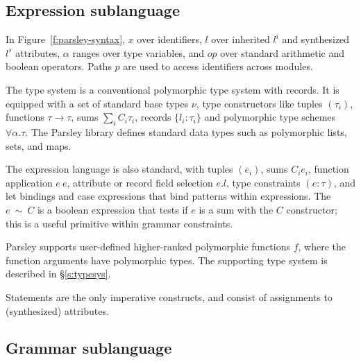 \documentclass[letterpaper]{article}
\begin{document}
\subsection*{Expression sublanguage}
\label{ss:lang:expr}

In Figure~\ref{f:parsley-syntax}, $x$ over identifiers, $l$ over
inherited $l^i$ and synthesized $l^s$ attributes, $\alpha$ ranges over
type variables, and $op$ over standard arithmetic and boolean
operators.  Paths $p$ are used to access identifiers across modules.

The type system is a conventional polymorphic type system
with records.  It is equipped with a set of standard base types $\nu$, type
constructors like tuples $(\tau_i)$, functions $\tau\rightarrow\tau$,
sums $\sum_iC_i\tau_i$, records $\{l_i:\tau_i\}$ and
polymorphic type schemes $\forall\alpha.\tau$.  The Parsley library
defines standard data types such as polymorphic lists, sets, and maps.

The expression language is also standard, with tuples $(e_i)$, sums
$C_i e_i$, function application $e\ e$, attribute or record field
selection $e.l$, type constraints $(e:\tau)$, and let bindings and
case expressions that bind patterns within expressions.  The
$e\ \sim\ C$ is a boolean expression that tests if $e$ is a sum with
the $C$ constructor; this is a useful primitive within grammar
constraints.

Parsley supports user-defined higher-ranked polymorphic functions $f$,
where the function arguments have polymorphic types.  The supporting
type system is described in \S\ref{s:typesys}.

Statements are the only imperative constructs, and consist of
assignments to (synthesized) attributes.

\subsection*{Grammar sublanguage}
\label{ss:lang:grammar}
\end{document}
